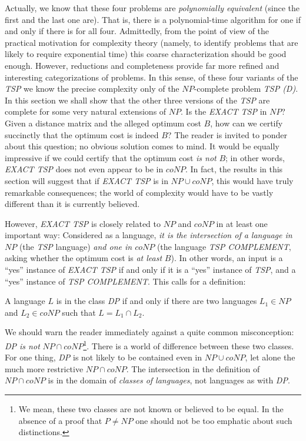 Actually, we know that these four problems are \textit{polynomially equivalent} (since the first and the last one are). That is, there is a polynomial-time algorithm for one if and only if there is for all four. Admittedly, from the point of view of the practical motivation for complexity theory (namely, to identify problems that are likely to require exponential time) this coarse characterization should be good enough. However, reductions and completeness provide far more refined and interesting categorizations of problems. In this sense, of these four variants of the \textit{TSP} we know the precise complexity only of the $NP$-complete problem \textit{TSP (D)}. In this section we shall show that the other three versions of the \textit{TSP} are complete for some very natural extensions of $NP$. Is the \textit{EXACT TSP} in $NP$? Given a distance matrix and the alleged optimum cost $B$, how can we certify succinctly that the optimum cost is indeed $B$? The reader is invited to ponder about this question; no obvious solution comes to mind. It would be equally impressive if we could certify that the optimum cost \textit{is not} $B$; in other words, \textit{EXACT TSP} does not even appear to be in $coNP$. In fact, the results in this section will suggest that if \textit{EXACT TSP} is in $NP \cup coNP$, this would have truly remarkable consequences; the world of complexity would have to be vastly different than it is currently believed.

However, \textit{EXACT TSP} is closely related to $NP$ and $coNP$ in at least one important way: Considered as a language, \textit{it is the intersection of a language in $NP$} (the \textit{TSP} language) \textit{and one in $coNP$} (the language \textit{TSP COMPLEMENT}, asking whether the optimum cost is \textit{at least} $B$). In other words, an input is a ``yes'' instance of \textit{EXACT TSP} if and only if it is a ``yes'' instance of \textit{TSP}, and a ``yes'' instance of \textit{TSP COMPLEMENT}. This calls for a definition:
\begin{defbox}
  A language $L$ is in the class \textit{DP} if and only if there are two languages $L_1 \in NP$ and $L_2 \in coNP$ such that $L = L_1 \cap L_2$.
\end{defbox}
We should warn the reader immediately against a quite common misconception: \textit{DP is not} $NP \cap coNP$\footnote{We mean, these two classes are not known or believed to be equal. In the absence of a proof that $P \neq NP$ one should not be too emphatic about such distinctions.}. There is a world of difference between these two classes. For one thing, \textit{DP} is not likely to be contained even in $NP \cup coNP$, let alone the much more restrictive $NP \cap coNP$. The intersection in the definition of $NP \cap coNP$ is in the domain of \textit{classes of languages}, not languages as with \textit{DP}.

